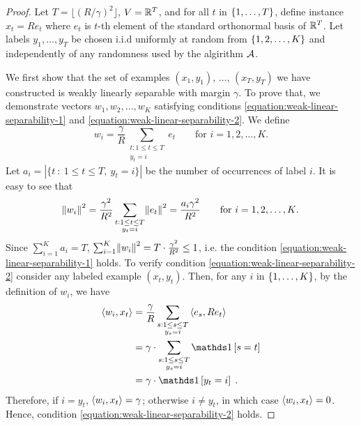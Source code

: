 \begin{proof}
Let $T = \lfloor (R/\gamma)^2 \rfloor$, $V = \mathbb{R}^T$, and for all $t$ in
$\cbr{1,\ldots,T}$, define instance $x_t = R e_t$ where $e_t$ is $t$-th element
of the standard orthonormal basis of $\mathbb{R}^T$.
Let labels $y_1, \ldots, y_T$ be chosen i.i.d uniformly at random from
$\cbr{1,2,\ldots,K}$ and independently of any randomness used by the algirithm
$\mathcal{A}$.




We first show that the set of examples $(x_1,y_1)$, $\ldots$,
$(x_T, y_T)$ we have constructed is weakly linearly separable
with margin $\gamma$. To prove that, we demonstrate vectors $w_1, w_2, \dots, w_K$
satisfying conditions \eqref{equation:weak-linear-separability-1} and
\eqref{equation:weak-linear-separability-2}. We define
$$
w_i = \frac{\gamma}{R} \sum_{\substack{t : 1 \le t \le T \\ y_t = i}} e_t \qquad \text{for $i=1,2,\dots,K$.}
$$
Let $a_i = |\{ t ~:~ 1 \le t \le T, \ y_t = i \}|$ be the number of occurrences of label $i$.
It is easy to see that
$$
\norm{w_i}^2 = \frac{\gamma^2}{R^2} \sum_{\substack{t : 1 \le t \le T \\ y_t = i}} \norm{e_t}^2 = \frac{a_i \gamma^2}{R^2} \qquad \text{for $i=1,2,\dots,K$.}
$$
Since $\sum_{i=1}^K a_i = T$,
$\sum_{i=1}^K \norm{w_i}^2 = T \cdot \frac{\gamma^2}{R^2} \leq 1$, i.e.
the condition
\eqref{equation:weak-linear-separability-1} holds. To verify condition
\eqref{equation:weak-linear-separability-2} consider any labeled example $(x_t,
y_t)$. Then, for any $i$ in $\cbr{1,\ldots,K}$, by the definition of $w_i$, we have
\begin{align*}
\ip{w_i}{x_t}
& = \frac{\gamma}{R} \sum_{\substack{s : 1 \le s \le T \\ y_s = i}} \ip{e_s}{R e_t} \\
& = \gamma \cdot \sum_{\substack{s : 1 \le s \le T \\ y_s = i}} \indicator{s = t} \\
& = \gamma \cdot \indicator{y_t = i}
\; .
\end{align*}
Therefore, if $i = y_t$, $\left\langle w_i, x_t \right\rangle = \gamma$;
otherwise $i \neq y_t$, in which case $\left\langle w_i, x_t \right\rangle = 0$.
Hence, condition \eqref{equation:weak-linear-separability-2} holds.


\end{proof}

